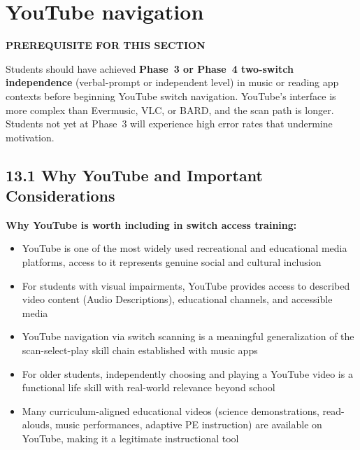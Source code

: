 \documentclass[justified,openright]{tufte-book}
\renewcommand{\chaptermark}[1]{\markboth{#1}{}}
\begin{document}

\chapter{YouTube navigation}\label{section-13-youtube-navigation}

\chaptermark{YouTube navigation}



\textbf{PREREQUISITE FOR THIS SECTION}

Students should have achieved \textbf{Phase~3 or Phase~4 two-switch
independence} (verbal-prompt or independent level) in music or reading
app contexts before beginning YouTube switch navigation. YouTube's
interface is more complex than Evermusic, VLC, or BARD, and the scan
path is longer. Students not yet at Phase~3 will experience high error
rates that undermine motivation.


\section{13.1 Why YouTube and Important Considerations}\label{why-youtube}


\textbf{Why YouTube is worth including in switch access training:}

\begin{itemize}

\item
  YouTube is one of the most widely used recreational and educational
  media platforms, access to it represents genuine social and
  cultural inclusion
\item
  For students with visual impairments, YouTube provides access to
  described video content (Audio Descriptions), educational channels,
  and accessible media
\item
  YouTube navigation via switch scanning is a meaningful generalization
  of the scan-select-play skill chain established with music apps
\item
  For older students, independently choosing and playing a YouTube
  video is a functional life skill with real-world relevance beyond
  school
\item
  Many curriculum-aligned educational videos (science demonstrations,
  read-alouds, music performances, adaptive PE instruction) are
  available on YouTube, making it a legitimate instructional tool
\end{itemize}
\end{document}
